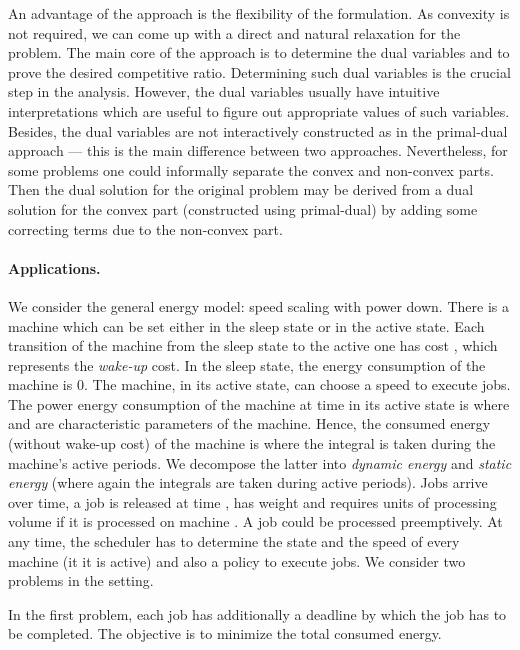 \documentclass[11pt]{article}
\begin{document}
An advantage of the approach is the flexibility of the formulation. 
As convexity is not required, we can come up with a direct and natural relaxation for the problem.
The main core of the approach is to determine the dual variables
and to prove the desired competitive ratio. Determining such dual variables is the crucial 
step in the analysis. However, the dual variables usually have intuitive interpretations which are useful  
to figure out appropriate values of such variables. Besides, the dual variables are not interactively 
constructed as in the primal-dual approach --- this is the main difference between two approaches.
Nevertheless, for some problems one could informally separate the convex and non-convex parts. Then 
the dual solution for the original problem may be derived from 
a dual solution for the convex part (constructed using primal-dual) by
adding some correcting terms due to the non-convex part. 



\paragraph{Applications.}
We consider the general energy model: speed scaling with power down. 
There is a machine which can be set either in the sleep state or in the active 
state. Each transition of the machine from the sleep state to the active one has 
cost , which represents the \emph{wake-up} cost. 
In the sleep state, the energy consumption of the machine is 0. 
The machine, in its active state, can choose a speed 
to execute jobs. The power energy consumption of 
the machine at time  in its active state is 
where  and  are characteristic parameters of 
the machine. Hence, the consumed energy (without wake-up cost) of the machine
is  where the integral is taken during the machine's 
active periods. We decompose the latter into \emph{dynamic energy} 
 and \emph{static energy} 
 (where again the integrals are taken during
active periods).
Jobs arrive over time, a job  is released at time , has weight  
and requires  units of processing volume if it is processed 
on machine . A job could be processed preemptively.
At any time, the scheduler has to determine the state and the speed of every machine (it it is active) 
and also a policy to execute jobs.
We consider two problems in the setting.

In the first problem, each job  has additionally a deadline  by which 
the job has to be completed. The objective is to minimize the total consumed
energy.  
\end{document}
